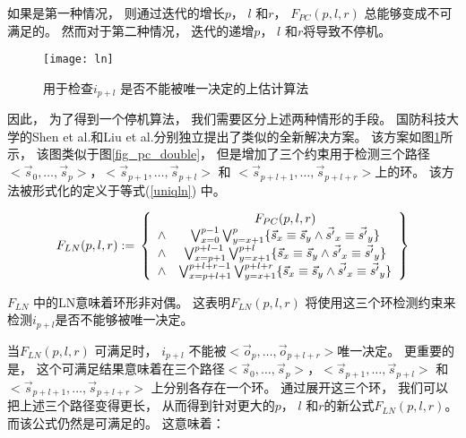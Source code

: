 如果是第一种情况，
则通过迭代的增长$p$， $l$ 和$r$，
$F_{PC}(p,l,r)$ 总能够变成不可满足的。
然而对于第二种情况，
迭代的递增$p$， $l$ 和$r$将导致不停机。

\begin{figure}[t]
\begin{center}
\texttt{[image: ln]}
\end{center}
\caption{用于检查$i_{p+l}$ 是否不能被唯一决定的上估计算法}
  \label{fig_ln_double}
\end{figure}



因此，
为了得到一个停机算法，
我们需要区分上述两种情形的手段。
国防科技大学的Shen et al.和Liu et al.分别独立提出了类似的全新解决方案。
该方案如图\ref{fig_ln_double}所示，
该图类似于图\ref{fig_pc_double}，
但是增加了三个约束用于检测三个路径$<\vec{s}_{0},\dots,\vec{s}_{p}>$，$<\vec{s}_{p+1},\dots,\vec{s}_{p+l}>$ 和
$<\vec{s}_{p+l+1},\dots,\vec{s}_{p+l+r}>$上的环。
该方法被形式化的定义于等式(\ref{uniqln}) 中。

\begin{equation}\label{uniqln}
F_{LN}(p,l,r):=\\
\left\{
\begin{array}{cc}
&F_{PC}(p,l,r)\\
\wedge&\bigvee_{x=0}^{p-1}\bigvee_{y=x+1}^{p} \{\vec{s}_x\equiv \vec{s}_y\wedge \vec{s'}_x\equiv \vec{s'}_y\} \\
\wedge&\bigvee_{x=p+1}^{p+l-1}\bigvee_{y=x+1}^{p+l} \{\vec{s}_x\equiv \vec{s}_y\wedge \vec{s'}_x\equiv \vec{s'}_y\} \\
\wedge&\bigvee_{x=p+l+1}^{p+l+r-1}\bigvee_{y=x+1}^{p+l+r} \{\vec{s}_x\equiv \vec{s}_y\wedge \vec{s'}_x\equiv \vec{s'}_y\}
\end{array}
\right\}
\end{equation}

$F_{LN}$ 中的LN意味着环形非对偶。
这表明$F_{LN}(p,l,r)$ 将使用这三个环检测约束来检测$i_{p+l}$是否不能够被唯一决定。

当$F_{LN}(p,l,r)$ 可满足时，
$i_{p+l}$ 不能被$<\vec{o}_{p},\dots,\vec{o}_{p+l+r}>$唯一决定。
更重要的是，
这个可满足结果意味着在三个路径$<\vec{s}_{0},\dots,\vec{s}_{p}>$，$<\vec{s}_{p+1},\dots,\vec{s}_{p+l}>$ 和
$<\vec{s}_{p+l+1},\dots,\vec{s}_{p+l+r}>$
上分别各存在一个环。
通过展开这三个环，
我们可以把上述三个路径变得更长，
从而得到针对更大的$p$， $l$ 和$r$的新公式$F_{LN}(p,l,r)$。
而该公式仍然是可满足的。
这意味着：


